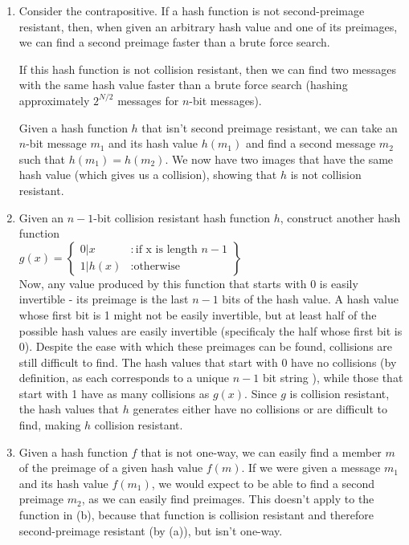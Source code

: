 \begin{enumerate}
\item Consider the contrapositive. If a hash function is not second-preimage
  resistant, then, when given an arbitrary hash value and one of its preimages,
  we can find a second preimage faster than a brute force
  search.

If this hash function is not collision resistant, then we can find two
messages with the same hash value faster than a brute force search (hashing
approximately $2^{N/2}$ messages for $n$-bit messages).

Given a hash function $h$ that isn't second preimage resistant, we can take
an $n$-bit message $m_1$ and its hash value $h(m_1)$ and find a second
message $m_2$ such that $h(m_1) = h(m_2)$. We now have two images that have
the same hash value (which gives us a collision), showing that $h$ is not
collision resistant.

\item Given an $n-1$-bit collision resistant hash function $h$, construct
  another hash function \\
  $g(x) = \left\{
    \begin{array}{lr}
      0|x & : \text{if x is length }n-1\\
      1|h(x) & : \text{otherwise}
    \end{array}
    \right\}$ \\

Now, any value produced by this function that starts with 0 is easily
invertible - its preimage is the last $n-1$ bits of the hash value. A hash
value whose first bit is 1 might not be easily invertible, but at least half
of the possible hash values are easily invertible (specificaly the half whose
first bit is 0). Despite the ease with which these preimages can be found,
collisions are still difficult to find. The hash values that start with 0 have
no collisions (by definition, as each corresponds to a unique $n-1$ bit string
), while those that start with 1 have as many collisions as $g(x)$. Since $g$ is
collision resistant, the hash values that $h$ generates either have no
collisions or are difficult to find, making $h$ collision resistant.

\item Given a hash function $f$ that is not one-way, we can easily find a member
$m$ of the preimage of a given hash value $f(m)$. If we were given a message
$m_1$ and its hash value $f(m_1)$, we would expect to be able to find a second
preimage $m_2$, as we can easily find preimages. This doesn't apply to the
function in (b), because that function is collision resistant and therefore
second-preimage resistant (by (a)), but isn't one-way.

\end{enumerate}
